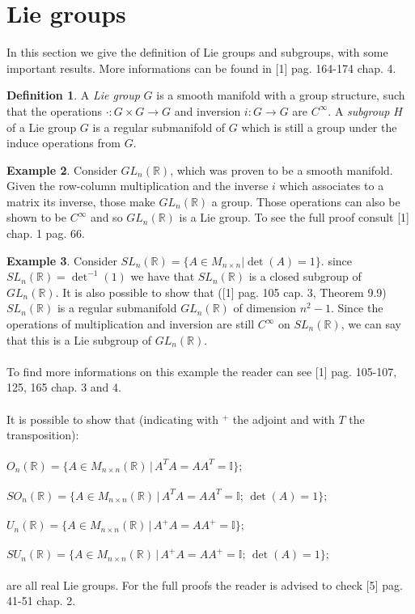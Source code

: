 \documentclass[12pt,a4paper]{report}
\theoremstyle{definition}
\newtheorem{Def}{Definition}[chapter]
\theoremstyle{Theorem}
\theoremstyle{definition}
\newtheorem{Ex}[Def]{Example}
\theoremstyle{definition}
\begin{document}
	\section{Lie groups}
	In this section we give the definition of Lie groups and subgroups, with some important results. More informations can be found in [1] pag. 164-174 chap. 4.
	\begin{Def}
		A \textit{Lie group} $G$ is a smooth manifold with a group structure, such that the operations $\cdot:G\times G\rightarrow G$ and inversion $i:G\rightarrow G$ are $C^\infty$.
		A \textit{subgroup} $H$ of a Lie group $G$ is a regular submanifold of $G$ which is still a group under the induce operations from $G$.
	\end{Def}
	\begin{Ex}
		Consider $GL_n(\mathbb{R})$, which was proven to be a smooth manifold. Given the row-column multiplication and the inverse $i$ which associates to a matrix its inverse, those make $GL_n(\mathbb{R})$ a group. Those operations can also be shown to be $C^\infty$ and so $GL_n(\mathbb{R})$ is a Lie group. To see the full proof consult [1] chap. 1 pag. 66.
	\end{Ex}
	\begin{Ex}
		Consider $SL_n(\mathbb{R})=\{A\in M_{n\times n}| \det(A)=1\}$. since $SL_n(\mathbb{R})=\det^{-1}(1)$ we have that $SL_n(\mathbb{R})$ is a closed subgroup of $GL_n(\mathbb{R})$. It is also possible to show that ([1] pag. 105 cap. 3, Theorem 9.9) $SL_n(\mathbb{R})$ is a regular submanifold $GL_n(\mathbb{R})$ of dimension $n^2-1$. Since the operations of multiplication and inversion are still $C^\infty$ on $SL_n(\mathbb{R})$, we can say that this is a Lie subgroup of $GL_n(\mathbb{R})$.\\
		\\
		To find more informations on this example the reader can see [1] pag. 105-107, 125, 165 chap. 3 and 4.\\
		\\
		It is possible to show that (indicating with $^+$ the adjoint and with $T$ the transposition):\\\\
		$O_n(\mathbb{R})=\{A\in M_{n\times n}(\mathbb{R})\, |\, A^TA=AA^T=\mathbb{I}\};$\\\\
		$SO_n(\mathbb{R})=\{A\in M_{n\times n}(\mathbb{R})\, |\, A^TA=AA^T=\mathbb{I};\, \det(A)=1\};$\\\\
		$U_n(\mathbb{R})=\{A\in M_{n\times n}(\mathbb{R})\, |\, A^+A=AA^+=\mathbb{I}\};$\\\\
		$SU_n(\mathbb{R})=\{A\in M_{n\times n}(\mathbb{R})\, |\, A^+A=AA^+=\mathbb{I};\,\det(A)=1\};$\\\\
		are all real Lie groups. 
		For the full proofs the reader is advised to check [5] pag. 41-51 chap. 2.
	\end{Ex}
\end{document}
